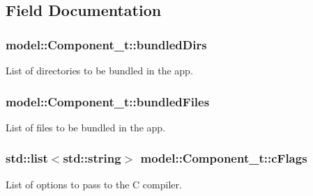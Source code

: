 \subsection{Field Documentation}
\subsubsection[{\texorpdfstring{bundled\+Dirs}{bundledDirs}}]{ model\+::\+Component\+\_\+t\+::bundled\+Dirs}\hypertarget{structmodel_1_1_component__t_af841f6513fcff3ddabbc73085411ef51}{}\label{structmodel_1_1_component__t_af841f6513fcff3ddabbc73085411ef51}


List of directories to be bundled in the app. 

\subsubsection[{\texorpdfstring{bundled\+Files}{bundledFiles}}]{ model\+::\+Component\+\_\+t\+::bundled\+Files}\hypertarget{structmodel_1_1_component__t_aa433094e072dc63c58bff4f39a361401}{}\label{structmodel_1_1_component__t_aa433094e072dc63c58bff4f39a361401}


List of files to be bundled in the app. 

\subsubsection[{\texorpdfstring{c\+Flags}{cFlags}}]{\setlength{\rightskip}{0pt plus 5cm}std\+::list$<$std\+::string$>$ model\+::\+Component\+\_\+t\+::c\+Flags}\hypertarget{structmodel_1_1_component__t_a72dfa15e3934bc3dd19b039f1aeb48e1}{}\label{structmodel_1_1_component__t_a72dfa15e3934bc3dd19b039f1aeb48e1}


List of options to pass to the C compiler. 

